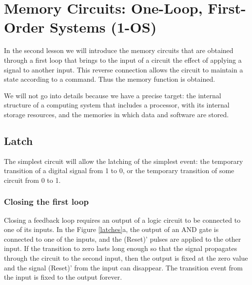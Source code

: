 \chapter{Memory Circuits: One-Loop, First-Order Systems (1-OS)}



In the second lesson we will introduce the memory circuits that are obtained through a first loop that brings to the input of a circuit the effect of applying a signal to another input. This reverse connection allows the circuit to maintain a state according to a command. Thus the memory function is obtained.

We will not go into details because we have a precise target: the internal structure of a computing system that includes a processor, with its internal storage resources, and the memories in which data and software are stored.

\section{Latch}

The simplest circuit will allow the latching of the simplest event: the temporary transition of a digital signal from 1 to 0, or the temporary transition of some circuit from 0 to 1.

\subsection{Closing the first loop}

Closing a feedback loop requires an output of a logic circuit to be connected to one of its inputs. In the Figure \ref{latches}a, the output of an AND gate is connected to one of the inputs, and the (Reset)' pulses are applied to the other input. If the transition to zero lasts long enough so that the signal propagates through the circuit to the second input, then the output is fixed at the zero value and the signal (Reset)' from the input can disappear. The transition event from the input is fixed to the output forever.



